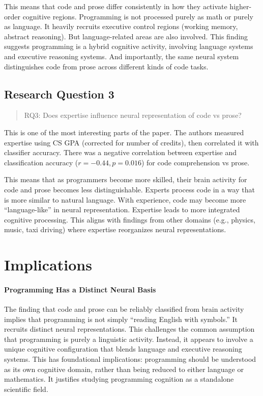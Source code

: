 This means that code and prose differ consistently in how they activate higher-order cognitive regions. Programming is not processed purely as math or purely as language. It heavily recruits executive control regions (working memory, abstract reasoning). But language-related areas are also involved. This finding suggests programming is a hybrid cognitive activity, involving language systems and executive reasoning systems. And importantly, the same neural system distinguishes code from prose across different kinds of code tasks.

\subsection{Research Question 3}
\begin{quote}
    RQ3: Does expertise influence neural representation of code vs prose?
\end{quote}
This is one of the most interesting parts of the paper. The authors measured expertise using CS GPA (corrected for number of credits), then correlated it with classifier accuracy. There was a negative correlation between expertise and classification accuracy ($r = -0.44, p = 0.016$) for code comprehension vs prose.

This means that as programmers become more skilled, their brain activity for code and prose becomes less distinguishable. Experts process code in a way that is more similar to natural language. With experience, code may become more “language-like” in neural representation. Expertise leads to more integrated cognitive processing. This aligns with findings from other domains (e.g., physics, music, taxi driving) where expertise reorganizes neural representations.

\section{Implications}
\paragraph{Programming Has a Distinct Neural Basis} The finding that code and prose can be reliably classified from brain activity implies that programming is not simply “reading English with symbols.” It recruits distinct neural representations. This challenges the common assumption that programming is purely a linguistic activity. Instead, it appears to involve a unique cognitive configuration that blends language and executive reasoning systems. This has foundational implications: programming should be understood as its own cognitive domain, rather than being reduced to either language or mathematics. It justifies studying programming cognition as a standalone scientific field.
